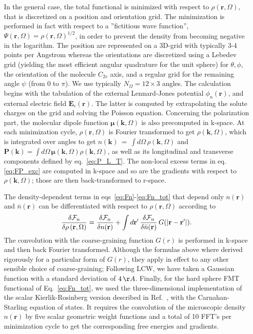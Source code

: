 \documentclass[aip,jcp,preprint]{revtex4-1}
\newcommand{\rr}{\mathbf{r}}
\newcommand{\kk}{\mathbf{k}}
\newcommand{\rhorom}{{\rho\left({\mathbf r},\Omega\right)}}
\newcommand{\F}{{\cal F}}
\newcommand{\MU}{\boldsymbol{\mu}}
\newcommand{\rhonbar}{\bar{n}({\mathbf r})}
\newcommand{\PP}{\mathbf{P}}
\newcommand{\EE}{\mathbf{E}}
\begin{document}
In the general case, the total functional  is minimized with respect to $\rhorom$, that is discretized  on a  position and orientation grid.  The minimization is performed in fact with respect to a ''fictitious wave function'', $\Psi(\rr,\Omega)=\rho(\rr,\Omega)^{1/2}$,  in order to prevent the density from becoming negative in the logarithm. The position are represented on a 3D-grid with typically 3-4  points per Angstrom whereas the orientations are discretized using a Lebedev grid (yielding the most efficient angular quadrature for the unit sphere\cite{lebedev99}) for $\theta, \phi$, the orientation of the molecule $C_{2v}$ axis, and a regular grid for the remaining angle $\psi$ (from $0$ to $\pi$). We use typically $N_\Omega = 12 \times 3$ angles. The calculation begins with the tabulation of the external Lennard-Jones potential $\phi_n(\rr)$, and external electric field $\EE_c(\rr)$. The latter is computed by extrapolating the solute charges on the grid and solving the Poisson equation. Concerning the polarization part, the molecular dipole function $\MU(\kk,\Omega)$ is also precomputed in k-space.   At each minimization cycle, $\rhorom$ is Fourier transformed to get 
$\rho(\kk,\Omega)$,  which is integrated over angles to get $n(\kk)~=~\int d\Omega \, \rho(\kk,\Omega)$ and $\PP(\kk) = \int d\Omega \, \MU(\kk,\Omega) \rho(\kk,\Omega)$,  as well as  its longitudinal and transverse components defined by eq.~\ref{eq:P_L_T}.
The non-local excess terms in eq.\ref{eq:FP_exc} are computed in k-space and so are the gradients with respect to $\rho(\kk,\Omega)$; those are then back-transformed to r-space. 

The density-dependent terms in eqs~\ref{eq:Fn}-\ref{eq:Fn_tot}  that depend only $n(\rr)$ and 
$\rhonbar$ can be differentiated with respect to $\rhorom$ according to 
\begin{equation}
    \frac{\delta \F_n}{\delta \rhorom} =  \frac{\delta \F_n}{\delta n(\rr)} + \int d\rr' \, \frac{\delta \F_n}{\delta \rhonbar} \, G(|\rr - \rr'|).
\end{equation}
The convolution with the coarse-graining function $G(r)$  is performed in k-space and then back Fourier transformed. Although the formulas above where derived rigorously for a particular form of $G(r)$, they apply in effect to any other sensible choice of coarse-graining; Following LCW\cite{lum99}, we have taken a Gaussian function with a standard deviation of $4 \, \AA$.  Finally, for the hard sphere FMT functional of Eq.~\ref{eq:Fn_tot}, we used the three-dimensional implementation of the scalar Kierlik-Rosinberg version described in Ref.~\cite{levesque12_1}, with the Carnahan-Starling equation of states. It requires the convolution of the microscopic density $n(\rr)$ by five scalar geometric  weight functions and a total of 10 FFT's per minimization cycle to get the corresponding free energies and gradients. 
\end{document}
